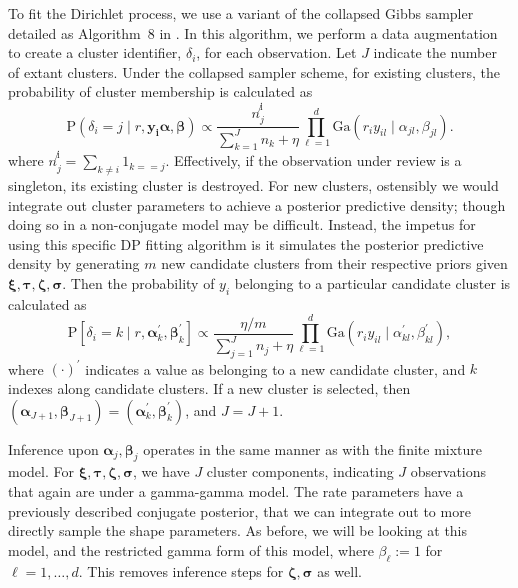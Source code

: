   To fit the Dirichlet process, we use a variant of the collapsed Gibbs sampler detailed as
  Algorithm~8 in \citet{neal2000}.  In this algorithm, we perform a data augmentation to create a
  cluster identifier, $\delta_i$, for each observation. Let $J$ indicate the number of extant clusters.
  Under the collapsed sampler scheme, for existing clusters, the probability of cluster membership is
  calculated as
  \begin{equation}
    \label{eqn:dpdelta}
    \text{P}\left(\delta_i = j\mid r, \bm{ y_i} \bm{ \alpha}, \bm{ \beta}\right) \propto
        \frac{n_j^{\not i}}{\sum_{k = 1}^{J} n_k + \eta}
        {\textstyle\prod}_{\ell = 1}^d\text{Ga}\left(r_iy_{il}\mid\alpha_{jl},\beta_{jl}\right).
  \end{equation}
  where $n_j^{\not i} = {\textstyle\sum}_{k\neq i}1_{k == j}$.  Effectively, if the observation under review is a
  singleton, its existing cluster is destroyed.  For new clusters, ostensibly we would integrate out
  cluster parameters to achieve a posterior predictive density; though doing so in a
  non-conjugate model may be difficult.  Instead, the impetus for using this specific DP fitting algorithm
  is it simulates the posterior predictive density by generating $m$ new candidate clusters from
  their respective priors given $\bm{ \xi,\tau,\zeta,\sigma}$.  Then the probability of $y_i$
  belonging to a particular candidate cluster is calculated as
  \begin{equation}
    \label{eqn:dpdeltanew}
    \text{P}\left[\delta_i = k\mid r, \bm{ \alpha}_k^{\prime}, \bm{ \beta}_k^{\prime}\right] \propto
        \frac{\eta / m}{\sum_{j = 1}^{J} n_j + \eta}
        {\textstyle\prod}_{\ell = 1}^d\text{Ga}\left(r_iy_{il}\mid\alpha_{kl}^{\prime},\beta_{kl}^{\prime}\right),
  \end{equation}
  where $(\cdot)^{\prime}$ indicates a value as belonging to a new candidate cluster, and $k$ indexes
  along candidate clusters.  If a new cluster is selected, then
  $(\bm{\alpha}_{J+1},\bm{\beta}_{J+1}) = (\bm{\alpha}_k^{\prime},\bm{\beta}_k^{\prime})$, and $J = J + 1$.

Inference upon $\bm{ \alpha}_j,\bm{ \beta}_j$ operates in the same manner as with the finite mixture
  model.  For $\bm{ \xi,\tau,\zeta,\sigma}$, we have $J$ cluster components, indicating $J$
  observations that again are under a gamma-gamma model.  The rate parameters have a previously
  described conjugate posterior, that we can integrate out to more directly sample the shape
  parameters.  As before, we will be looking at this model, and the restricted gamma form of this model, where
  $\beta_{\ell} := 1$ for $\ell = 1,\ldots,d$.  This removes inference steps for $\bm{ \zeta},\bm{ \sigma}$
  as well.


